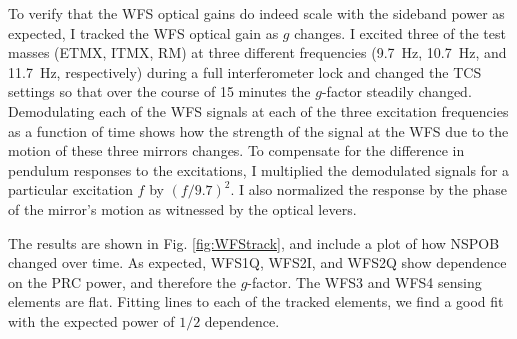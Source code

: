 To verify that the WFS optical gains do indeed scale with the sideband
power as expected, I tracked the WFS optical gain as $g$ changes. I
excited three of the test masses (ETMX, ITMX, RM) at three different
frequencies (9.7~Hz, 10.7~Hz, and 11.7~Hz, respectively) during a full
interferometer lock and changed the TCS settings so that over the
course of 15 minutes the $g$-factor steadily changed. Demodulating
each of the WFS signals at each of the three excitation frequencies as
a function of time shows how the strength of the signal at the WFS due
to the motion of these three mirrors changes. To compensate for the
difference in pendulum responses to the excitations, I multiplied the
demodulated signals for a particular excitation $f$ by $(f/9.7)^2$. I
also normalized the response by the phase of the mirror's motion as
witnessed by the optical levers.

The results are shown in Fig. \ref{fig:WFStrack}, and include a plot
of how NSPOB changed over time. As expected, WFS1Q, WFS2I, and WFS2Q
show dependence on the PRC power, and therefore the $g$-factor. The
WFS3 and WFS4 sensing elements are flat. Fitting lines to each of the
tracked elements, we find a good fit with the expected power of $1/2$
dependence. 

